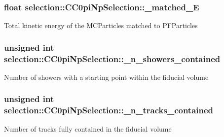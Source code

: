 \subsubsection[{\texorpdfstring{\+\_\+matched\+\_\+E}{_matched_E}}]{\setlength{\rightskip}{0pt plus 5cm}float selection\+::\+C\+C0pi\+Np\+Selection\+::\+\_\+matched\+\_\+E\hspace{0.3cm}{\ttfamily [private]}}\hypertarget{classselection_1_1CC0piNpSelection_ac75aa3ac33061bbdd378594ee7e6e2e5}{}\label{classselection_1_1CC0piNpSelection_ac75aa3ac33061bbdd378594ee7e6e2e5}
Total kinetic energy of the M\+C\+Particles matched to P\+F\+Particles 
\subsubsection[{\texorpdfstring{\+\_\+n\+\_\+showers\+\_\+contained}{_n_showers_contained}}]{\setlength{\rightskip}{0pt plus 5cm}unsigned int selection\+::\+C\+C0pi\+Np\+Selection\+::\+\_\+n\+\_\+showers\+\_\+contained\hspace{0.3cm}{\ttfamily [private]}}\hypertarget{classselection_1_1CC0piNpSelection_aebf4a69b8d7f3171ad90c382668c22ec}{}\label{classselection_1_1CC0piNpSelection_aebf4a69b8d7f3171ad90c382668c22ec}
Number of showers with a starting point within the fiducial volume 
\subsubsection[{\texorpdfstring{\+\_\+n\+\_\+tracks\+\_\+contained}{_n_tracks_contained}}]{\setlength{\rightskip}{0pt plus 5cm}unsigned int selection\+::\+C\+C0pi\+Np\+Selection\+::\+\_\+n\+\_\+tracks\+\_\+contained\hspace{0.3cm}{\ttfamily [private]}}\hypertarget{classselection_1_1CC0piNpSelection_a22c5cd4cf8882fa3cbabf25ed86d1f39}{}\label{classselection_1_1CC0piNpSelection_a22c5cd4cf8882fa3cbabf25ed86d1f39}
Number of tracks fully contained in the fiducial volume 
